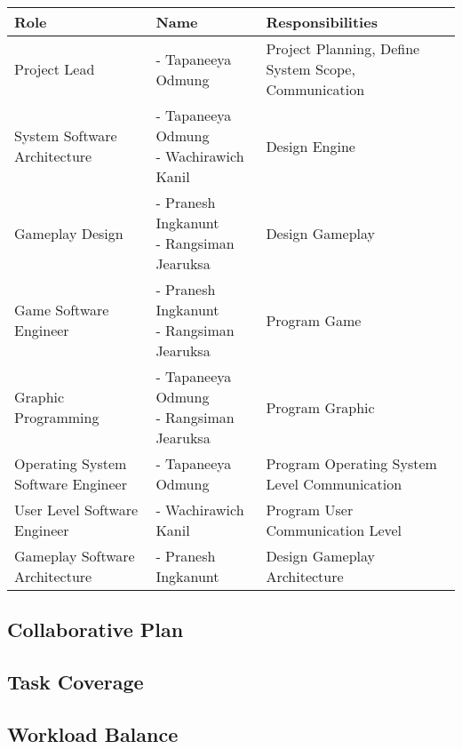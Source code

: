 \begin{multicols}{1}
\small
\begin{minipage}{\textwidth}
    \begin{tabularx}{\textwidth}{|L|L|L|}
        \hline
        \textbf{Role} & \textbf{Name} & \textbf{Responsibilities} \\
        \hline
        Project Lead & - Tapaneeya Odmung & Project Planning, Define System Scope, Communication \\
        System Software Architecture & {- Tapaneeya Odmung \newline - Wachirawich Kanil} & Design Engine \\
        Gameplay Design & {- Pranesh Ingkanunt \newline - Rangsiman Jearuksa} & Design Gameplay \\
        Game Software Engineer & {- Pranesh Ingkanunt \newline - Rangsiman Jearuksa} & Program Game \\
        Graphic Programming & {- Tapaneeya Odmung \newline - Rangsiman Jearuksa} & Program Graphic \\
        Operating System Software Engineer & - Tapaneeya Odmung & Program Operating System Level Communication \\
        User Level Software Engineer & - Wachirawich Kanil & Program User Communication Level \\
        Gameplay Software Architecture & - Pranesh Ingkanunt & Design Gameplay Architecture \\
        \hline
    \end{tabularx}
\end{minipage}
\label{tab:table}
\end{multicols}

\begin{multicols}{2}
\subsection{Collaborative Plan}
\label{subsec:collaborative-plan}

\subsection{Task Coverage}
\label{subsec:task-coverage}

\subsection{Workload Balance}
\label{subsec:workload-balance}
\end{multicols}